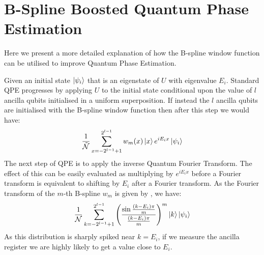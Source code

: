 \documentclass[aps,prx,twocolumn,floatfix,10pt,amssymb,amsfont,amsmath,superscriptaddress,float,nofootinbib,longbibliography,nobalancelastpage]{revtex4-2}
\theoremstyle{empty}
\begin{document}
\section{B-Spline Boosted Quantum Phase Estimation}
\label{section:appendix_a}
Here we present a more detailed explanation of how the B-spline window function can be utilised to improve Quantum Phase Estimation.

Given an initial state $\ket{\psi_i}$ that is an eigenstate of $U$ with eigenvalue $E_i$. Standard QPE progresses by applying $U$ to the initial state conditional upon the value of $l$ ancilla qubits initialised in a uniform superposition. If instead the $l$ ancilla qubits are initialised with the B-spline window function then after this step we would have:
\begin{equation}
    \frac{1}{\tilde{\mathcal{N}}}\sum_{x=-2^{l-1}+1}^{2^{l-1}} w_{m}(x) \ket{x} e^{iE_i x} \ket{\psi_i}
\end{equation}
The next step of QPE is to apply the inverse Quantum Fourier Transform. The effect of this can be easily evaluated as multiplying by $e^{iE_ix}$ before a Fourier transform is equivalent to shifting by $E_i$ after a Fourier transform. As the Fourier transform of the $m$-th B-spline $w_m$ is given by \cite{bspline}, we have:
\begin{equation}
\label{eq:ftb-spline}
        \frac{1}{\mathcal{N}} \sum_{k=-2^{l-1}+1}^{2^{l-1}} \left(\frac{\sin \frac{(k-E_i)\pi}{m}}{ \frac{(k-E_i)\pi}{m}}\right)^m \ket{k}\ket{\psi_i}
\end{equation}
As this distribution is sharply spiked near $k=E_i$, if we measure the ancilla register we are highly likely to get a value close to $E_i$.
\end{document}
